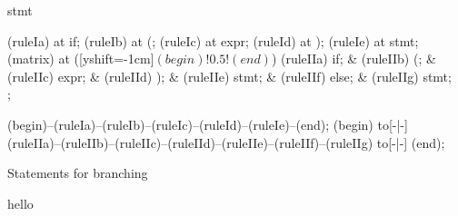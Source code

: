 \begin{syntaxfloat}
  \begin{syntax}{stmt}
    
    \node[terminal]    (ruleIa)  at  {if};
    \node[terminal]    (ruleIb)  at  {(};
    \node[nonterminal] (ruleIc)  at  {expr};
    \node[terminal]    (ruleId)  at  {)};
    \node[nonterminal] (ruleIe)  at  {stmt};
    \node [matrix,column sep=0.8cm] (matrix) at ([yshift=-1cm]$(begin)!0.5!(end)$) {
      \node[terminal]    (ruleIIa) {if};
      &
      \node[terminal]    (ruleIIb) {(};
      &
      \node[nonterminal] (ruleIIc) {expr};
      &
      \node[terminal]    (ruleIId) {)};
      &
      \node[nonterminal] (ruleIIe) {stmt};
      &
      \node[terminal]    (ruleIIf) {else};
      &
      \node[nonterminal] (ruleIIg) {stmt};
      \\
    };
    
    \draw[path] (begin)--(ruleIa)--(ruleIb)--(ruleIc)--(ruleId)--(ruleIe)--(end);
    \draw[path] (begin) to[-|-] (ruleIIa)--(ruleIIb)--(ruleIIc)--(ruleIId)--(ruleIIe)--(ruleIIf)--(ruleIIg) to[-|-] (end);
  \end{syntax}
  \caption{Statements for branching}
\end{syntaxfloat}

hello
